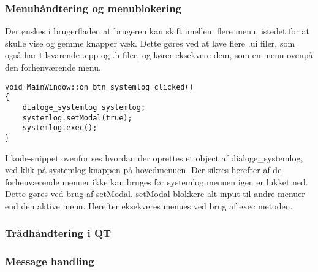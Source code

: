 \subsubsection{ Menuhåndtering og menublokering }
Der ønskes i brugerfladen at brugeren kan skift imellem flere menu, istedet for at skulle vise og gemme knapper væk. Dette gøres ved at lave flere .ui filer, som også har tilsvarende .cpp og .h filer, og kører eksekvere dem, som en menu ovenpå den forhenværende menu.
\begin{lstlisting}
void MainWindow::on_btn_systemlog_clicked()
{
    dialoge_systemlog systemlog;
    systemlog.setModal(true);
    systemlog.exec();
}
\end{lstlisting}
I kode-snippet ovenfor ses hvordan der oprettes et object af dialoge\_systemlog, ved klik på systemlog knappen på hovedmenuen. Der sikres herefter af de forhenværende menuer ikke kan bruges før systemlog menuen igen er lukket ned. Dette gøres ved brug af setModal. setModal blokkere alt input til andre menuer end den aktive menu. Herefter eksekveres menues ved brug af exec metoden.

\subsubsection{Trådhåndtering i QT}

\subsubsection{Message handling}
